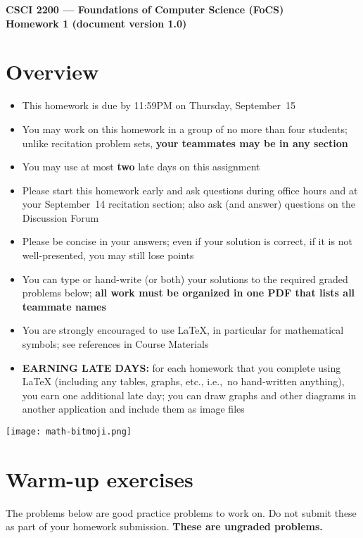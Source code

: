 \documentclass[11pt]{article}
\begin{document}
\thispagestyle{empty}   %

\begin{center}
\large
\textbf{CSCI 2200 --- Foundations of Computer Science (FoCS) \\
Homework 1 (document version 1.0)}
\end{center}

\section*{Overview}
\begin{itemize}
\item This homework is due by 11:59PM on Thursday, September~15
\item You may work on this homework in a group of no more than four students;
  unlike recitation problem sets,
  \textbf{your teammates may be in any section}
\item You may use at most \textbf{two} late days on this assignment
\item Please start this homework early and ask questions during
  office hours and at your September~14 recitation section;
  also ask (and answer) questions on the Discussion Forum 
\item Please be concise in your answers;
  even if your solution is correct, if it is not well-presented,
  you may still lose points
\item You can type or hand-write (or both) your solutions
  to the required graded problems below;
  \textbf{all work must be organized in one PDF that lists
  all teammate names}
\item You are strongly encouraged to use LaTeX, in particular for
  mathematical symbols;
  see references in Course Materials
\item \textbf{EARNING LATE DAYS:}
  for each homework that you complete using LaTeX
  (including any tables, graphs, etc., i.e.,~no hand-written anything),
  you earn one additional late day;
  you can draw graphs and other diagrams
  in another application and include them as image files
\end{itemize}

\vspace{0.2in}

\begin{center}
\texttt{[image: math-bitmoji.png]}
\end{center}

\newpage
\section*{Warm-up exercises}
The problems below are good practice problems to work on.
Do not submit these as part of your homework submission.
\textbf{These are ungraded problems.}
\end{document}
